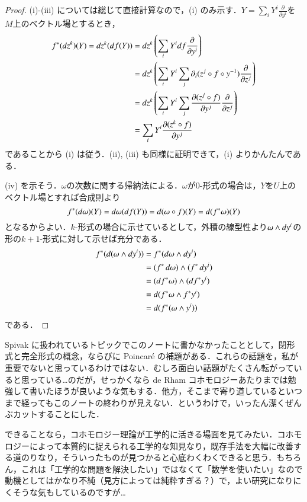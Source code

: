 \begin{proof}
(i)-(iii) については総じて直接計算なので，(i) のみ示す．$Y = \sum_i Y^i \frac{\partial}{\partial y^i}$を$M$上のベクトル場とするとき，
\begin{align}
f^*(\mathop{}\!d z^k)(Y) = \mathop{}\!d z^k (df (Y)) &= \mathop{}\!d z^k \left( \sum_i Y^i df \frac{\partial}{\partial y^i} \right) \\
&= \mathop{}\!d z^k \left( \sum_i Y^i \sum_j \partial_i (z^j \circ f \circ y^{-1}) \frac{\partial}{\partial z^j} \right) \\
&= \mathop{}\!d z^k \left( \sum_i Y^i \sum_j \frac{\partial (z^j \circ f)}{\partial y^j} \frac{\partial}{\partial z^j} \right) \\
&= \sum_i Y^i \frac{\partial (z^k \circ f)}{\partial y^j}
\end{align}であることから (i) は従う．(ii), (iii) も同様に証明できて，(i) よりかんたんである．

(iv) を示そう．$\omega$の次数に関する帰納法による．$\omega$が0-形式の場合は，$Y$を$U$上のベクトル場とすれば合成則より
\begin{equation}
f^*(\mathop{}\!d \omega)(Y) = \mathop{}\!d \omega (\mathop{}\!d f (Y)) = \mathop{}\!d (\omega \circ f) (Y) = \mathop{}\!d (f^* \omega)(Y)
\end{equation}となるからよい．$k$-形式の場合に示せているとして，外積の線型性より$\omega \wedge \mathop{}\!d y^i$の形の$k+1$-形式に対して示せば充分である．
\begin{align}
f^* (\dif (\omega \wedge \dif y^i)) &= f^* (\dif \omega \wedge \dif y^i) \\
&= (f^* \dif \omega) \wedge (f^* \dif y^i) \\
&= (\dif f^* \omega) \wedge (\dif f^* y^i) \\
&= \dif(f^* \omega \wedge f^* y^i) \\
&= \dif (f^* (\omega \wedge y^i)) \\
\end{align}である．
\end{proof}

\begin{dig}
Spivak に扱われているトピックでこのノートに書かなかったこととして，閉形式と完全形式の概念，ならびに Poincar\'e の補題がある．これらの話題を，私が重要でないと思っているわけではない．むしろ面白い話題がたくさん転がっていると思っている…のだが，せっかくなら de Rham コホモロジーあたりまでは勉強して書いたほうが良いような気もする．他方，そこまで寄り道しているといつまで経ってもこのノートの終わりが見えない．というわけで，いったん潔くぜんぶカットすることにした．

できることなら，コホモロジー理論が工学的に活きる場面を見てみたい．コホモロジーによって本質的に捉えられる工学的な知見なり，既存手法を大幅に改善する道のりなり，そういったものが見つかると心底わくわくできると思う．もちろん，これは「工学的な問題を解決したい」ではなくて「数学を使いたい」なので動機としてはかなり不純（見方によっては純粋すぎる？）で，よい研究になりにくそうな気もしているのですが…
\end{dig}

